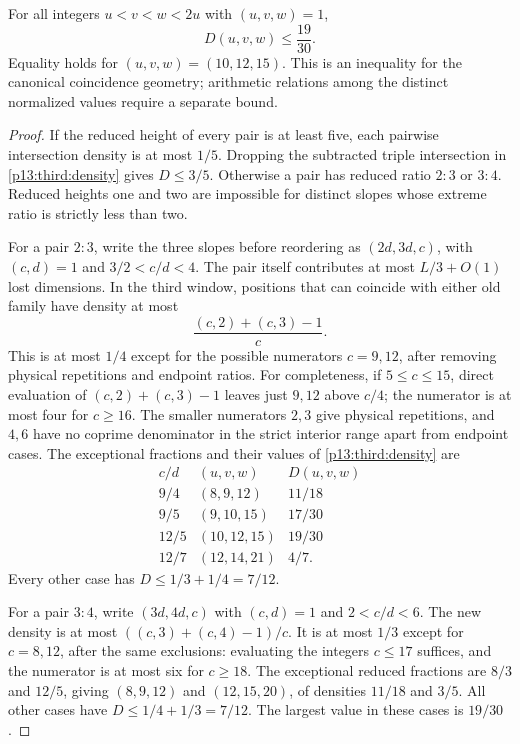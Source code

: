 \begin{lemma}
\label{p13:third:rational-rank}
For all integers $u<v<w<2u$ with $(u,v,w)=1$,
\begin{equation}
 D(u,v,w)\leq\frac{19}{30}.
 \label{p13:third:1930}
\end{equation}
Equality holds for $(u,v,w)=(10,12,15)$.
This is an inequality for the canonical coincidence geometry; arithmetic
relations among the distinct normalized values require a separate bound.
\end{lemma}

\begin{proof}
If the reduced height of every pair is at least five, each pairwise
intersection density is at most $1/5$.  Dropping the subtracted triple
intersection in \eqref{p13:third:density} gives $D\leq3/5$.
Otherwise a pair has reduced ratio $2:3$ or $3:4$.  Reduced heights one
and two are impossible for distinct slopes whose extreme ratio is
strictly less than two.

For a pair $2:3$, write the three slopes before reordering as
$(2d,3d,c)$, with $(c,d)=1$ and $3/2<c/d<4$.
The pair itself contributes at most $L/3+O(1)$ lost dimensions.
In the third window, positions that can coincide with either old family
have density at most
\[
 \frac{(c,2)+(c,3)-1}{c}.
\]
This is at most $1/4$ except for the possible numerators $c=9,12$,
after removing physical repetitions and endpoint ratios.
For completeness, if $5\leq c\leq15$, direct evaluation of
$(c,2)+(c,3)-1$ leaves just $9,12$ above $c/4$; the numerator is at most
four for $c\geq16$.  The smaller numerators $2,3$ give physical
repetitions, and $4,6$ have no coprime denominator in the strict
interior range apart from endpoint cases.  The exceptional fractions
and their values of \eqref{p13:third:density} are
\[
 \begin{array}{c|c|c}
 c/d & (u,v,w)&D(u,v,w)\\ \hline
 9/4&(8,9,12)&11/18\\
 9/5&(9,10,15)&17/30\\
 12/5&(10,12,15)&19/30\\
 12/7&(12,14,21)&4/7.
 \end{array}
\]
Every other case has $D\leq1/3+1/4=7/12$.

For a pair $3:4$, write $(3d,4d,c)$ with $(c,d)=1$ and
$2<c/d<6$.  The new density is at most
$((c,3)+(c,4)-1)/c$.  It is at most $1/3$ except for $c=8,12$,
after the same exclusions: evaluating the integers $c\leq17$ suffices,
and the numerator is at most six for $c\geq18$.
The exceptional reduced fractions are $8/3$ and $12/5$, giving
$(8,9,12)$ and $(12,15,20)$, of densities $11/18$ and $3/5$.
All other cases have $D\leq1/4+1/3=7/12$.
The largest value in these cases is $19/30$.
\end{proof}

